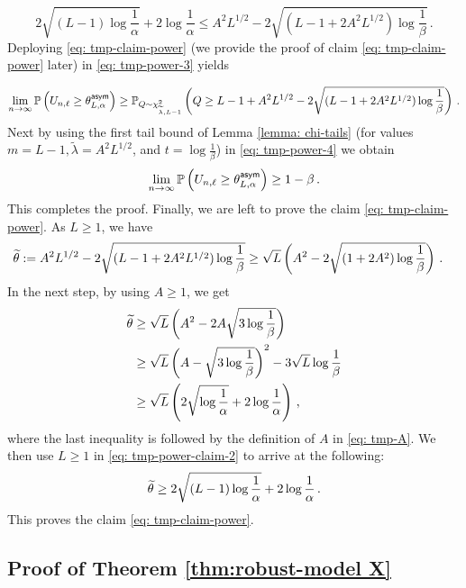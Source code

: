 \documentclass[11pt]{article}
\begin{document}
\begin{equation}\label{eq: tmp-claim-power}
 2\sqrt{(L-1)\log\frac{1}{\alpha}} + 2\log\frac{1}{\alpha}  \leq A^2L^{1/2}-2\sqrt{(L-1+2A^2L^{1/2})\log\frac{1}{\beta}}\,.
\end{equation}
Deploying \eqref{eq: tmp-claim-power} (we provide the proof of claim \eqref{eq: tmp-claim-power} later) in \eqref{eq: tmp-power-3} yields 

\begin{equation} \label{eq: tmp-power-4}
\lim\limits_{n\rightarrow \infty}^{} {\mathbb P}\left(U_{n,\ell}\geq \theta^{\mathsf{asym}}_{L,\alpha} \right)\geq {\mathbb P}_{Q\sim  \chi^2_{\widetilde{\lambda},L-1}} \left(Q\geq L-1+ A^2L^{1/2}-2\sqrt{(L-1+2A^2L^{1/2})\log\frac{1}{\beta}} \right)\,.
\end{equation}
Next by using the first tail bound of Lemma \ref{lemma: chi-tails} (for values $m=L-1, \widetilde{\lambda}=A^2L^{1/2}$, and $t=\log\frac{1}{\beta}$) in \eqref{eq: tmp-power-4} we obtain
\[
\lim\limits_{n\rightarrow \infty}^{} {\mathbb P}\left(U_{n,\ell}\geq \theta^{\mathsf{asym}}_{L,\alpha} \right)\geq 1-\beta\,.
\]
This completes the proof. Finally, we are left to prove the claim \eqref{eq: tmp-claim-power}. As $L\geq 1$, we have
\begin{align*}
&\widetilde{\theta}:=A^2L^{1/2}-2\sqrt{(L-1+2A^2L^{1/2})\log\frac{1}{\beta}}\geq \sqrt{L}\left(A^2-  2\sqrt{(1+2A^2)\log\frac{1}{\beta}}  \right)\,.
\end{align*}
In the next step, by using $A\geq 1$, we get
\begin{align}
\widetilde{\theta}&\geq \sqrt{L}\left(A^2-  2A\sqrt{3\log\frac{1}{\beta}}  \right)\nonumber\\
&\geq \sqrt{L}\left(A - \sqrt{3\log\frac{1}{\beta}}  \right)^2-3\sqrt{L}\log\frac{1}{\beta}\nonumber\\
&\geq\sqrt{L}\left( 2\sqrt{\log\frac{1}{\alpha}}+2\log\frac{1}{\alpha}\right)\label{eq: tmp-power-claim-2} \,,
\end{align}
where the last inequality is followed by the definition of $A$ in \eqref{eq: tmp-A}. We then use $L\geq 1$ in \eqref{eq: tmp-power-claim-2} to arrive at the following:
\[
\widetilde{\theta}\geq 2\sqrt{(L-1)\log\frac{1}{\alpha}}+2\log\frac{1}{\alpha}\label{eq: tmp-power-claim} \,.
\]
This proves the claim \eqref{eq: tmp-claim-power}.
\subsection{Proof of Theorem \ref{thm:robust-model X} }\label{proof:thm:robust-model X}
\end{document}

